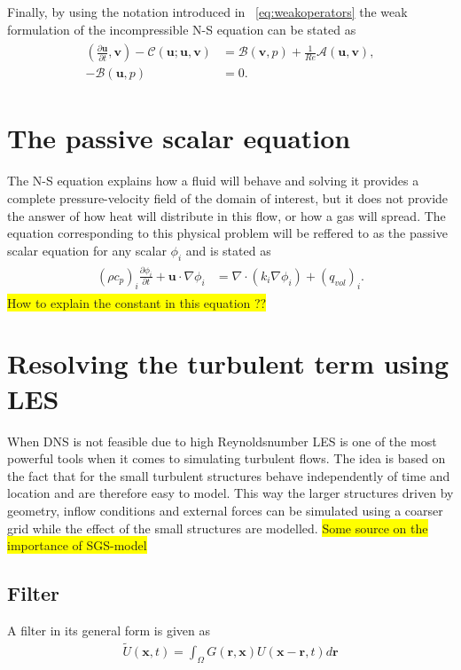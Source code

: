 Finally, by using the notation introduced in ~\ref{eq:weakoperators} the weak formulation of the incompressible
N-S equation can be stated as 
\begin{align}
    \begin{split}
        (\frac{\partial \mathbf{u}}{\partial t},\mathbf{v})
        - \mathcal{C}(\mathbf{u};\mathbf{u},\mathbf{v})
        &= \mathcal{B}(\mathbf{v},p) 
        +\frac{1}{Re}\mathcal{A}(\mathbf{u},\mathbf{v}), \\
        -\mathcal{B}(\mathbf{u},p) &= 0.
    \end{split}
	\label{eq:NSweak}
\end{align}


%
\section{The passive scalar equation}
The N-S equation explains how a fluid will behave and solving it provides a complete pressure-velocity field of the 
domain of interest, but it does not provide the answer of how heat will distribute in this flow, or how a gas will spread.
The equation corresponding to this physical problem will be reffered to as the passive scalar equation for any scalar 
$\phi_i$ and is stated as 
\begin{align}
    \begin{split}
        (\rho c_p)_i\frac{\partial \phi_i}{\partial t} + \mathbf{u}\cdot \nabla\phi_i 
        &= \nabla \cdot(k_i\nabla \phi_i)+ (q_{vol})_i.
    \end{split}
	\label{eq:PS}
\end{align}
\colorbox{yellow}{How to explain the constant in this equation ??} 
\section{Resolving the turbulent term using LES}
When DNS is not feasible due to high Reynoldsnumber LES is one of the most powerful tools when it comes to simulating turbulent flows.
The idea is based on the fact that for the small turbulent structures behave independently of time and location and are therefore 
easy to model. This way the larger structures driven by geometry, inflow conditions and external forces can be simulated using a coarser 
grid while the effect of the small structures are modelled. \colorbox{yellow}{Some source on the importance of SGS-model}

\subsection{Filter}
A filter in its general form is given as 
\begin{align}
    \tilde{U}(\mathbf{x},t) = \int_{\Omega} G(\mathbf{r},\mathbf{x})U(\mathbf{x}-\mathbf{r},t)d\mathbf{r}
    \label{eq:filter}
\end{align}

